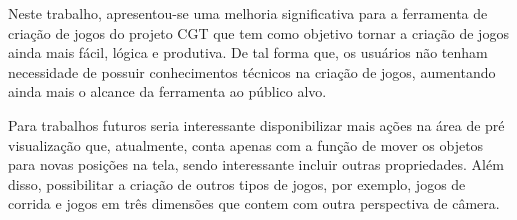 \documentclass[12pt,oneside,openright,a4paper,english,brazil,sumario=tradicional]{abntex2}
\begin{document}
Neste trabalho, apresentou-se uma melhoria significativa para a ferramenta de criação de jogos do projeto CGT que tem como objetivo tornar a criação de jogos ainda mais fácil, lógica e produtiva. De tal forma que, os usuários não tenham necessidade de possuir conhecimentos técnicos na criação de jogos, aumentando ainda mais o alcance da ferramenta ao público alvo.

Para trabalhos futuros seria interessante disponibilizar mais ações na área de pré visualização que, atualmente, conta apenas com a função de mover os objetos para novas posições na tela, sendo interessante incluir outras propriedades. Além disso, possibilitar a criação de outros tipos de jogos, por exemplo, jogos de corrida e jogos em três dimensões que contem com outra perspectiva de câmera.

\postextual

\end{document}
